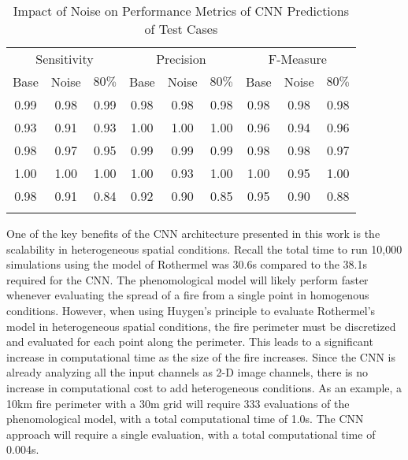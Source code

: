 \documentclass[smallcondensed]{svjour3}     %
\begin{document}
\begin{table}[htb]
\centering
\caption{Impact of Noise on Performance Metrics of CNN Predictions of Test Cases}
\label{tab:noise}       %
\begin{tabular*}{0.95\textwidth}{c @{\extracolsep{\fill}} cccccccc}
\multicolumn{3}{c}{Sensitivity} & \multicolumn{3}{c}{Precision} & \multicolumn{3}{c}{F-Measure} \\

Base & Noise & $80\%$ & Base & Noise & $80\%$ & Base & Noise & $80\%$ \\
\noalign{\smallskip}\hline\noalign{\smallskip}
0.99 & 0.98 & 0.99 & 0.98 & 0.98 & 0.98 & 0.98 & 0.98 & 0.98 \\
0.93 & 0.91 & 0.93 & 1.00 & 1.00 & 1.00 & 0.96 & 0.94 & 0.96 \\
0.98 & 0.97 & 0.95 & 0.99 & 0.99 & 0.99 & 0.98 & 0.98 & 0.97 \\
1.00 & 1.00 & 1.00 & 1.00 & 0.93 & 1.00 & 1.00 & 0.95 & 1.00 \\
0.98 & 0.91 & 0.84 & 0.92 & 0.90 & 0.85 & 0.95 & 0.90 & 0.88 \\
\noalign{\smallskip}\hline
\end{tabular*}
\end{table}

One of the key benefits of the CNN architecture presented in
this work is the scalability in heterogeneous spatial conditions.
Recall the total time to run 10,000 simulations using the model
of Rothermel was 30.6s compared to the 38.1s required for the CNN.
The phenomological model will likely perform faster whenever
evaluating the spread of a fire from a single point in homogenous
conditions. However,
when using Huygen's principle to evaluate Rothermel's model in
heterogeneous spatial conditions, the
fire perimeter must be discretized and evaluated for each point
along the perimeter. This leads to a significant increase in
computational time as the size of the fire increases.
Since the CNN is already analyzing all the input channels as 2-D
image channels, there is no increase in computational cost to
add heterogeneous conditions.
As an
example, a 10km fire perimeter with a 30m grid will require 333
evaluations of the phenomological model, with a total computational
time of 1.0s.
The CNN approach will require a single evaluation, with a total
computational time of 0.004s. 
\end{document}

